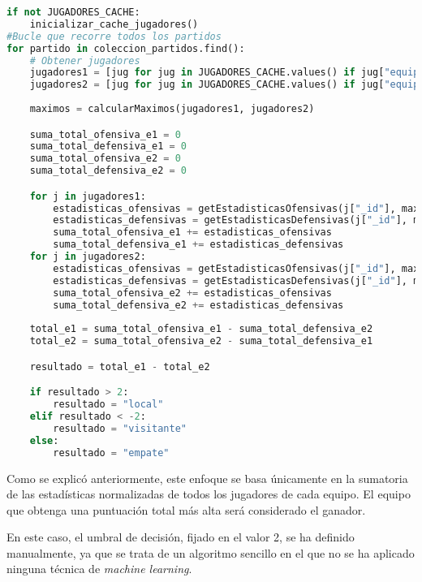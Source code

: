 \begin{lstlisting}[language=Python, caption={Algoritmo sin zonas}, label={lst:codigo-python}]
if not JUGADORES_CACHE:
    inicializar_cache_jugadores()
#Bucle que recorre todos los partidos
for partido in coleccion_partidos.find():
    # Obtener jugadores
    jugadores1 = [jug for jug in JUGADORES_CACHE.values() if jug["equipo"] == partido["Local"] and jug["rival"] == partido["Visitante"] and jug["temporada"] == partido["Temporada"]]
    jugadores2 = [jug for jug in JUGADORES_CACHE.values() if jug["equipo"] == partido["Visitante"] and jug["rival"] == partido["Local"] and jug["temporada"] == partido["Temporada"]]
    
    maximos = calcularMaximos(jugadores1, jugadores2)

    suma_total_ofensiva_e1 = 0
    suma_total_defensiva_e1 = 0
    suma_total_ofensiva_e2 = 0
    suma_total_defensiva_e2 = 0

    for j in jugadores1:
        estadisticas_ofensivas = getEstadisticasOfensivas(j["_id"], maximos)
        estadisticas_defensivas = getEstadisticasDefensivas(j["_id"], maximos)
        suma_total_ofensiva_e1 += estadisticas_ofensivas
        suma_total_defensiva_e1 += estadisticas_defensivas
    for j in jugadores2:
        estadisticas_ofensivas = getEstadisticasOfensivas(j["_id"], maximos)
        estadisticas_defensivas = getEstadisticasDefensivas(j["_id"], maximos)
        suma_total_ofensiva_e2 += estadisticas_ofensivas
        suma_total_defensiva_e2 += estadisticas_defensivas
    
    total_e1 = suma_total_ofensiva_e1 - suma_total_defensiva_e2
    total_e2 = suma_total_ofensiva_e2 - suma_total_defensiva_e1

    resultado = total_e1 - total_e2

    if resultado > 2:
        resultado = "local"
    elif resultado < -2:
        resultado = "visitante"
    else:
        resultado = "empate"
\end{lstlisting}

Como se explicó anteriormente, este enfoque se basa únicamente en la sumatoria de las estadísticas normalizadas de todos los jugadores de cada equipo. El equipo que obtenga una puntuación total más alta será considerado el ganador.

En este caso, el umbral de decisión, fijado en el valor 2, se ha definido manualmente, ya que se trata de un algoritmo sencillo en el que no se ha aplicado ninguna técnica de \textit{machine learning}.

